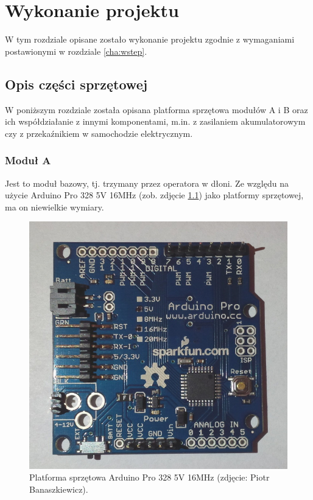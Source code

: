 \chapter{Wykonanie projektu}
\label{cha:specyfikacja_projektu}

W tym rozdziale opisane zostało wykonanie projektu zgodnie z wymaganiami postawionymi w rozdziale \ref{cha:wstep}.


\section{Opis części sprzętowej}
\label{sec:opis_cz_sprzetowej}

W poniższym rozdziale została opisana platforma sprzętowa modułów A i B oraz ich współdziałanie z innymi komponentami, m.in. z zasilaniem akumulatorowym czy z przekaźnikiem w samochodzie elektrycznym.

\subsection{Moduł A}
\label{subsec:modul_a}

Jest to moduł bazowy, tj. trzymany przez operatora w dłoni. Ze względu na użycie Arduino Pro 328 5V 16MHz \cite{Ard00} (zob. zdjęcie \ref{fig:arduino_pro}) jako platformy sprzętowej, ma on niewielkie wymiary.

\begin{figure}[h]
	\centering
	\includegraphics[scale=0.3]{pics/arduino_pro_scaled.jpg}
	\caption{\label{fig:arduino_pro}Platforma sprzętowa Arduino Pro 328 5V 16MHz (zdjęcie: Piotr Banaszkiewicz).}
\end{figure}

